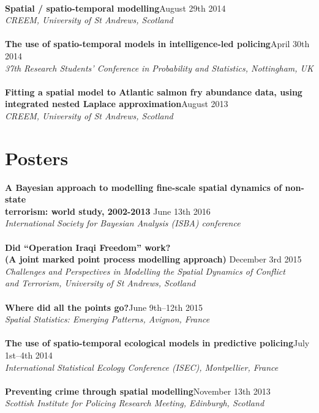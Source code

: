 \documentclass[10pt,letter]{article}
\begin{document}
 \hdashrule[0.5ex]{4cm}{1pt}{1pt}\\
 {\textbf{Spatial / spatio-temporal modelling}}\hfill August 29th 2014\\
 {\sl CREEM, University of St Andrews, Scotland}\\
 \hdashrule[0.5ex]{4cm}{1pt}{1pt}\\
{\textbf{The use of spatio-temporal models in intelligence-led policing}}\hfill  April 30th 2014\\
 {\sl 37th Research Students' Conference in Probability and Statistics, Nottingham, UK}\\
 \hdashrule[0.5ex]{4cm}{1pt}{1pt}\\
{\textbf{Fitting a spatial model to Atlantic salmon fry abundance data, using\\ integrated nested Laplace approximation}}\hfill  August 2013\\
 {\sl CREEM, University of St Andrews, Scotland}\\ 
 \vspace{-1mm}

\section*{Posters}
\vspace{1mm}

{\textbf {A Bayesian approach to modelling fine-scale spatial dynamics of non-state\\
 terrorism: world study, 2002-2013 }}\hfill June 13th 2016\\
 {\sl International Society for Bayesian Analysis (ISBA) conference}\\
 \hdashrule[0.5ex]{4cm}{1pt}{1pt}\\
 {\textbf{Did ``Operation Iraqi Freedom'' work? \\
(A joint marked point process modelling approach) }}\hfill December 3rd 2015\\
 {\sl Challenges and Perspectives in Modelling the Spatial Dynamics of Conflict\\ and Terrorism, University of St Andrews, Scotland}\\
 \hdashrule[0.5ex]{4cm}{1pt}{1pt}\\
{\textbf{Where did all the points go?}}\hfill June 9th--12th 2015\\
 {\sl Spatial Statistics: Emerging Patterns, Avignon, France}\\
\hdashrule[0.5ex]{4cm}{1pt}{1pt}\\
 {\textbf{The use of spatio-temporal ecological models in predictive policing}}\hfill July 1st--4th 2014\\
 {\sl International Statistical Ecology Conference (ISEC), Montpellier, France}\\
 \hdashrule[0.5ex]{4cm}{1pt}{1pt}\\
{\textbf{Preventing crime through spatial modelling}}\hfill November 13th 2013\\
 {\sl Scottish Institute for Policing Research Meeting, Edinburgh, Scotland}\\
\end{document}

